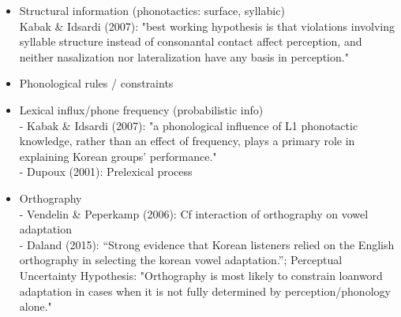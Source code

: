 \begin{itemize}
\item Structural information (phonotactics: surface, syllabic) \\
  Kabak \& Idsardi (2007): "best working hypothesis is that violations involving syllable structure instead of consonantal contact affect perception, and neither nasalization nor lateralization have any basis in perception."
  \item Phonological rules / constraints
  \item Lexical influx/phone frequency (probabilistic info) \\
    - Kabak \& Idsardi (2007): "a phonological influence of L1 phonotactic knowledge, rather than an effect of frequency, plays a primary role in explaining Korean groups’ performance." \\
    - Dupoux (2001): Prelexical process 

  \item Orthography \\
    - Vendelin \& Peperkamp (2006): Cf interaction of orthography on vowel adaptation \\ 
    - Daland (2015): ``Strong evidence that Korean listeners relied on the English orthography in selecting the korean vowel adaptation.''; Perceptual Uncertainty Hypothesis: "Orthography is most likely to constrain loanword adaptation in cases when it is not fully determined by perception/phonology alone."
    
\end{itemize}

